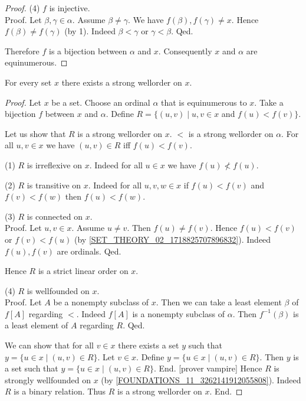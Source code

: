 \documentclass[../set-theory.tex]{subfiles}
\begin{document}
\begin{forthel}
\begin{proof}
      (4) $f$ is injective. \\
      Proof.
        Let $\beta, \gamma \in \alpha$.
        Assume $\beta \neq \gamma$.
        We have $f(\beta), f(\gamma) \neq x$.
        Hence $f(\beta) \neq f(\gamma)$ (by 1).
        Indeed $\beta < \gamma$ or $\gamma < \beta$.
      Qed.

      Therefore $f$ is a bijection between $\alpha$ and $x$.
      Consequently $x$ and $\alpha$ are equinumerous.
    \end{proof}
  \end{forthel}

  \begin{forthel}
    \begin{corollary}
      For every set $x$ there exists a strong wellorder on $x$.
    \end{corollary}
    \begin{proof}
      Let $x$ be a set.
      Choose an ordinal $\alpha$ that is equinumerous to $x$.
      Take a bijection $f$ between $x$ and $\alpha$.
      Define $R = \{ (u,v) \mid u, v \in x$ and $f(u) < f(v) \}$.

      Let us show that $R$ is a strong wellorder on $x$.
        ${<}$ is a strong wellorder on $\alpha$.
        For all $u, v \in x$ we have $(u, v) \in R$ iff $f(u) < f(v)$.

        (1) $R$ is irreflexive on $x$.
        Indeed for all $u \in x$ we have $f(u) \nless f(u)$.

        (2) $R$ is transitive on $x$.
        Indeed for all $u, v, w \in x$ if $f(u) < f(v)$ and $f(v) < f(w)$ then
        $f(u) < f(w)$.

        (3) $R$ is connected on $x$. \\
        Proof.
          Let $u, v \in x$.
          Assume $u \neq v$.
          Then $f(u) \neq f(v)$.
          Hence $f(u) < f(v)$ or $f(v) < f(u)$ (by
          \cref{SET_THEORY_02_1718825707896832}).
          Indeed $f(u), f(v)$ are ordinals.
        Qed.

        Hence $R$ is a strict linear order on $x$.

        (4) $R$ is wellfounded on $x$. \\
        Proof.
          Let $A$ be a nonempty subclass of $x$.
          Then we can take a least element $\beta$ of $f[A]$ regarding
          ${<}$.
          Indeed $f[A]$ is a nonempty subclass of $\alpha$.
          Then $f^{-1}(\beta)$ is a least element of $A$ regarding $R$.
        Qed.

        We can show that for all $v \in x$ there exists a set $y$ such that
        $y = \{ u \in x \mid (u,v) \in R \}$.
          Let $v \in x$.
          Define $y = \{ u \in x \mid (u,v) \in R \}$.
          Then $y$ is a set such that $y = \{ u \in x \mid (u,v) \in R \}$.
        End.
        [prover vampire]
        Hence $R$ is strongly wellfounded on $x$ (by
        \cref{FOUNDATIONS_11_3262141912055808}).
        Indeed $R$ is a binary relation.
        Thus $R$ is a strong wellorder on $x$.
      End.
    \end{proof}
  \end{forthel}
\end{document}
